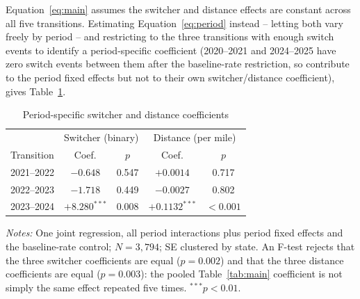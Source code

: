 \documentclass[preprint,12pt,authoryear]{elsarticle}
\begin{document}
Equation~\ref{eq:main} assumes the switcher and distance effects are
constant across all five transitions. Estimating Equation~\ref{eq:period}
instead -- letting both vary freely by period -- and restricting to
the three transitions with enough switch events to identify a
period-specific coefficient (2020--2021 and 2024--2025 have zero
switch events between them after the baseline-rate restriction, so
contribute to the period fixed effects but not to their own
switcher/distance coefficient), gives Table~\ref{tab:period}.

\begin{table}[htbp]
\centering
\caption{Period-specific switcher and distance coefficients}
\label{tab:period}
\begin{tabular}{@{}lcccc@{}}
\toprule
 & \multicolumn{2}{c}{Switcher (binary)} & \multicolumn{2}{c}{Distance (per mile)} \\
Transition & Coef. & $p$ & Coef. & $p$ \\
\midrule
2021--2022 & $-0.648$ & 0.547 & $+0.0014$ & 0.717 \\
2022--2023 & $-1.718$ & 0.449 & $-0.0027$ & 0.802 \\
2023--2024 & $+8.280^{***}$ & 0.008 & $+0.1132^{***}$ & $<0.001$ \\
\bottomrule
\end{tabular}
\vspace{2pt}
\begin{minipage}{0.85\textwidth}
\footnotesize\emph{Notes:} One joint regression, all period
interactions plus period fixed effects and the baseline-rate control;
$N=3{,}794$; SE clustered by state. An F-test rejects that the three
switcher coefficients are equal ($p=0.002$) and that the three
distance coefficients are equal ($p=0.003$): the pooled
Table~\ref{tab:main} coefficient is not simply the same effect
repeated five times. $^{***}p<0.01$.
\end{minipage}
\end{table}
\end{document}
